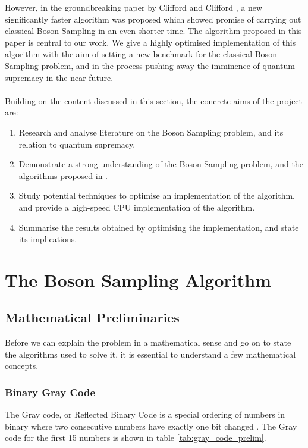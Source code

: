 \documentclass[ %
                    author={Manan Vaswani},
                supervisor={Dr. Raphael Clifford},
                    degree={MEng},
                     title={A multi-core CPU implementation of the classical Boson Sampling algorithm},
                  subtitle={},
                      type={},
                      year={2019} ]{dissertation}
\theoremstyle{plain}
\theoremstyle{definition}
\begin{document}
However, in the groundbreaking paper by Clifford and Clifford \cite{clifford17}, a new significantly faster algorithm was proposed which showed promise of carrying out classical Boson Sampling in an even shorter time. The algorithm proposed in this paper is central to our work. We give a highly optimised implementation of this algorithm with the aim of setting a new benchmark for the classical Boson Sampling problem, and in the process pushing away the imminence of quantum supremacy in the near future.
\\
\\
\noindent
Building on the content discussed in this section, the concrete aims of the project are:
\begin{enumerate}
\item Research and analyse literature on the Boson Sampling problem, and its relation to quantum supremacy.
\item Demonstrate a strong understanding of the Boson Sampling problem, and the algorithms proposed in \cite{clifford17}.
\item Study potential techniques to optimise an implementation of the algorithm, and provide a high-speed CPU implementation of the algorithm.
\item Summarise the results obtained by optimising the implementation, and state its implications.
\end{enumerate}


\chapter{The Boson Sampling Algorithm}
\label{chap:bosonSampling}

\section{Mathematical Preliminaries}
Before we can explain the problem in a mathematical sense and go on to state the algorithms used to solve it, it is essential to understand a few mathematical concepts.
\subsection{Binary Gray Code} \label{sec:gray_code}
The Gray code, or Reflected Binary Code is a special ordering of numbers in binary where two consecutive numbers have exactly one bit changed \cite{Nijenhuis1978}. The Gray code for the first 15 numbers is shown in table \ref{tab:gray_code_prelim}.
\end{document}
